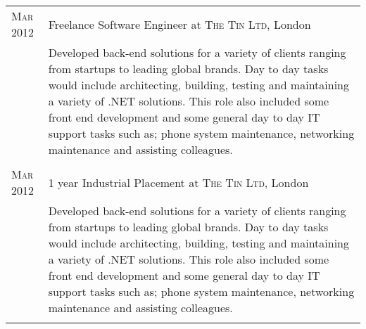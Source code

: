 \documentclass[a4paper,10pt]{article} %
\begin{document}
\begin{tabular}{ L{2cm} | L{11cm}}	
\textsc{Mar 2012} & Freelance Software Engineer at \textsc{The Tin Ltd}, London \\

& \footnotesize{Developed back-end solutions for a variety of clients ranging from startups to leading global brands. Day to day tasks would include architecting, building, testing and maintaining a variety of .NET solutions. This role also included some front end development and some general day to day IT support tasks such as; phone system maintenance, networking maintenance and assisting colleagues.}\\
 \\


\textsc{Mar 2012} & 1 year Industrial Placement at \textsc{The Tin Ltd}, London \\
& \footnotesize{Developed back-end solutions for a variety of clients ranging from startups to leading global brands. Day to day tasks would include architecting, building, testing and maintaining a variety of .NET solutions. This role also included some front end development and some general day to day IT support tasks such as; phone system maintenance, networking maintenance and assisting colleagues.}\\
 \\


%
%
\end{tabular}



\end{document}
